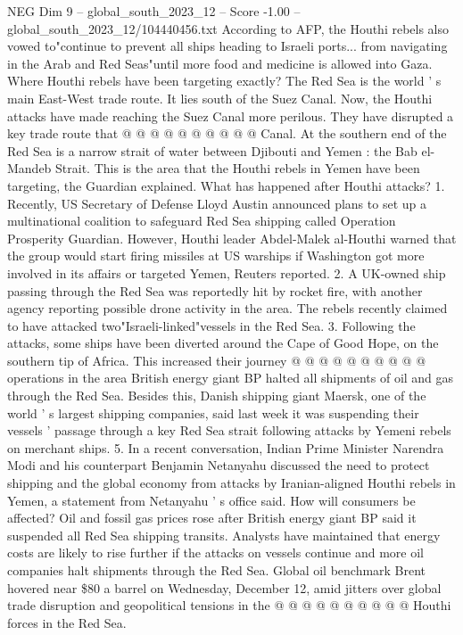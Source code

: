 \begin{textsample}{NEG Dim 9 – global\_south\_2023\_12 – Score -1.00 – global\_south\_2023\_12/104440456.txt}
According to AFP, the Houthi rebels also vowed to"continue to prevent all ships heading to Israeli ports... from navigating in the Arab and Red Seas"until more food and medicine is allowed into Gaza.
Where Houthi rebels have been targeting exactly?
The Red Sea is the world ' s main East-West trade route.
It lies south of the Suez Canal.
Now, the Houthi attacks have made reaching the Suez Canal more perilous.
They have disrupted a key trade route that @ @ @ @ @ @ @ @ @ @ Canal.
At the southern end of the Red Sea is a narrow strait of water between Djibouti and Yemen : the Bab el-Mandeb Strait.
This is the area that the Houthi rebels in Yemen have been targeting, the Guardian explained.
What has happened after Houthi attacks? 1.
Recently, US Secretary of Defense Lloyd Austin announced plans to set up a multinational coalition to safeguard Red Sea shipping called Operation Prosperity Guardian.
However, Houthi leader Abdel-Malek al-Houthi warned that the group would start firing missiles at US warships if Washington got more involved in its affairs or targeted Yemen, Reuters reported. 2.
A UK-owned ship passing through the Red Sea was reportedly hit by rocket fire, with another agency reporting possible drone activity in the area.
The rebels recently claimed to have attacked two"Israeli-linked"vessels in the Red Sea. 3.
Following the attacks, some ships have been diverted around the Cape of Good Hope, on the southern tip of Africa.
This increased their journey @ @ @ @ @ @ @ @ @ @ operations in the area British energy giant BP halted all shipments of oil and gas through the Red Sea.
Besides this, Danish shipping giant Maersk, one of the world ' s largest shipping companies, said last week it was suspending their vessels ' passage through a key Red Sea strait following attacks by Yemeni rebels on merchant ships. 5.
In a recent conversation, Indian Prime Minister Narendra Modi and his counterpart Benjamin Netanyahu discussed the need to protect shipping and the global economy from attacks by Iranian-aligned Houthi rebels in Yemen, a statement from Netanyahu ' s office said.
How will consumers be affected?
Oil and fossil gas prices rose after British energy giant BP said it suspended all Red Sea shipping transits.
Analysts have maintained that energy costs are likely to rise further if the attacks on vessels continue and more oil companies halt shipments through the Red Sea.
Global oil benchmark Brent hovered near \$80 a barrel on Wednesday, December 12, amid jitters over global trade disruption and geopolitical tensions in the @ @ @ @ @ @ @ @ @ @ Houthi forces in the Red Sea.

\end{textsample}
